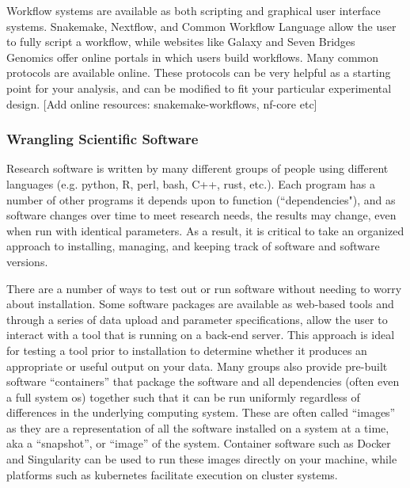 \documentclass[10pt,letterpaper]{article}
\begin{document}
Workflow systems are available as both scripting and graphical user interface systems. 
Snakemake, Nextflow, and Common Workflow Language allow the user to fully script a workflow, while websites like Galaxy and Seven Bridges Genomics offer online portals in which users build workflows. 
Many common protocols are available online. 
These protocols can be very helpful as a starting point for your analysis, and can be modified to fit your particular experimental design. 
[Add online resources: snakemake-workflows, nf-core etc] %


\subsubsection*{Wrangling Scientific Software} 
Research software is written by many different groups of people using different languages (e.g. python, R, perl, bash, C++, rust, etc.). 
Each program has a number of other programs it depends upon to function (``dependencies"), and as software changes over time to meet research needs, the results may change, even when run with identical parameters. 
As a result, it is critical to take an organized approach to installing, managing, and keeping track of software and software versions. 

There are a number of ways to test out or run software without needing to worry about installation. 
Some software packages are available as web-based tools and through a series of data upload and parameter specifications, allow the user to interact with a tool that is running on a back-end server. 
This approach is ideal for testing a tool prior to installation to determine whether it produces an appropriate or useful output on your data. 
Many groups also provide pre-built software “containers” that package the software and all dependencies (often even a full system os) together such that it can be run uniformly regardless of differences in the underlying computing system. 
These are often called “images” as they are a representation of all the software installed on a system at a time, aka a “snapshot”, or “image” of the system. 
Container software such as Docker and Singularity can be used to run these images directly on your machine, while platforms such as kubernetes facilitate execution on cluster systems.
\end{document}
